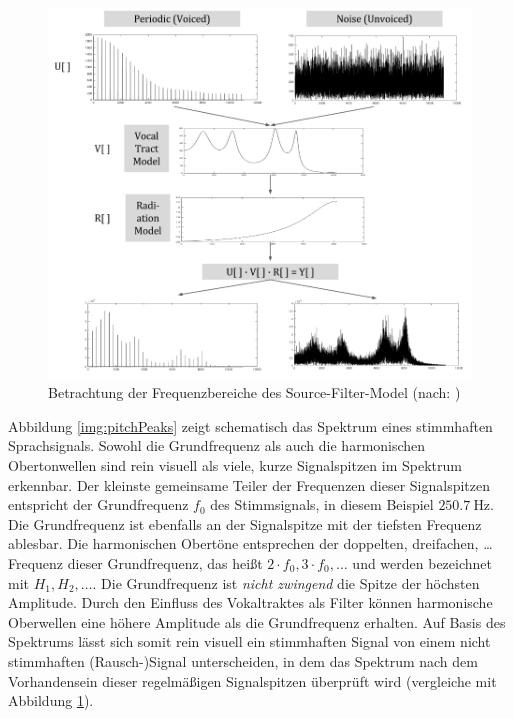 \begin{figure}[H]
	\centering
	\includegraphics[width=1\textwidth]{bilder/sourceFilterSpectra.png}
	\caption{Betrachtung der Frequenzbereiche des Source-Filter-Model (nach: \cite[Source Estimation, S. 3]{ricardo_ceps})}
	\label{img:sourceFilerSpectra}
\end{figure}	

Abbildung \ref{img:pitchPeaks} zeigt schematisch das Spektrum eines stimmhaften Sprachsignals. Sowohl die Grundfrequenz als auch die harmonischen Obertonwellen sind rein visuell als \glqq viele, kurze Signalspitzen\grqq{} im Spektrum erkennbar. Der kleinste gemeinsame Teiler der Frequenzen dieser Signalspitzen entspricht der Grundfrequenz $f_0$ des Stimmsignals, in diesem Beispiel $\SI{250.7}{\hertz}$. Die Grundfrequenz ist ebenfalls an der Signalspitze mit der tiefsten Frequenz ablesbar. Die harmonischen Obertöne entsprechen der doppelten, dreifachen, \ldots Frequenz dieser Grundfrequenz, das heißt $2\cdot f_0, 3\cdot f_0, \ldots$ und werden bezeichnet mit $H_1, H_2, \ldots$. Die Grundfrequenz ist \emph{nicht zwingend} die Spitze der höchsten Amplitude. Durch den Einfluss des Vokaltraktes als Filter können harmonische Oberwellen eine höhere Amplitude als die Grundfrequenz erhalten. Auf Basis des Spektrums lässt sich somit rein visuell ein stimmhaften Signal von einem nicht stimmhaften (Rausch-)Signal unterscheiden, in dem das Spektrum nach dem Vorhandensein dieser regelmäßigen Signalspitzen überprüft wird (vergleiche mit Abbildung \ref{img:sourceFilerSpectra}).\cite[S. 52 - 53]{sprachverarbeitung}

